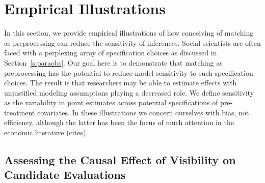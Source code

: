\documentclass[11pt,letterpaper]{article}
\theoremstyle{plain}
\begin{document}
%
%
%
%
%


\baselineskip

\section{Empirical Illustrations}

In this section, we provide empirical illustrations of how conceiving
of matching as preprocessing can reduce the sensitivity of inferences.
Social scientists are often faced with a perplexing array of
specification choices as discussed in Section~\ref{s:paraobs}.  Our
goal here is to demonstrate that matching as preprocessing has the
potential to reduce model sensitivity to such specification choices.
The result is that researchers may be able to estimate effects with
unjustified modeling assumptions playing a decreased role.  We define
sensitivity as the variability in point estimates across potential
specifications of pre-treatment covariates.  In these illustrations we
concern ourselves with bias, not efficiency, although the latter has
been the focus of much attention in the economic literature (cites). 

\subsection{Assessing the Causal Effect of Visibility on Candidate
  Evaluations}
\end{document}
